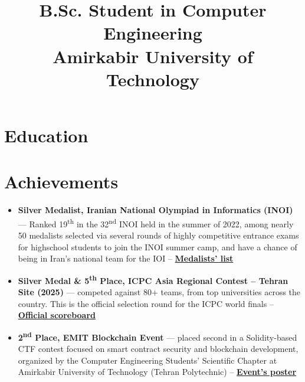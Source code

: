 \documentclass[11pt,a4paper,sans]{moderncv}
\title{B.Sc. Student in Computer Engineering \\ Amirkabir University of Technology}
\begin{document}
\makecvtitle

\section{Education}

\section{Achievements}
\begin{itemize}

  \item \textbf{Silver Medalist, Iranian National Olympiad in Informatics (INOI)} — Ranked 19\textsuperscript{th} in the 32\textsuperscript{nd} INOI held in the summer of 2022, among nearly 50 medalists selected via several rounds of highly competitive entrance exams for highschool students to join the INOI summer camp, and have a chance of being in Iran's national team for the IOI -- \href{https://opedia.ir/about/medalists/%DB%B1%DB%B4%DB%B0%DB%B1}{\textbf{Medalists' list}}
  
  \item \textbf{Silver Medal \& 5\textsuperscript{th} Place, ICPC Asia Regional Contest – Tehran Site (2025)} — competed against 80+ teams, from top universities across the country. This is the official selection round for the ICPC world finals -- \href{https://icpc.sharif.edu/2025/scoreboard/}{\textbf{Official scoreboard}}
  

  \item \textbf{2\textsuperscript{nd} Place, EMIT Blockchain Event} — placed second in a Solidity-based CTF contest focused on smart contract security and blockchain development, organized by the Computer Engineering Students' Scientific Chapter at Amirkabir University of Technology (Tehran Polytechnic) -- \href{https://www.linkedin.com/posts/students-scientific-chapter_emit-aut-activity-7297263986406776832}{\textbf{Event's poster}}
\end{itemize}
\end{document}
